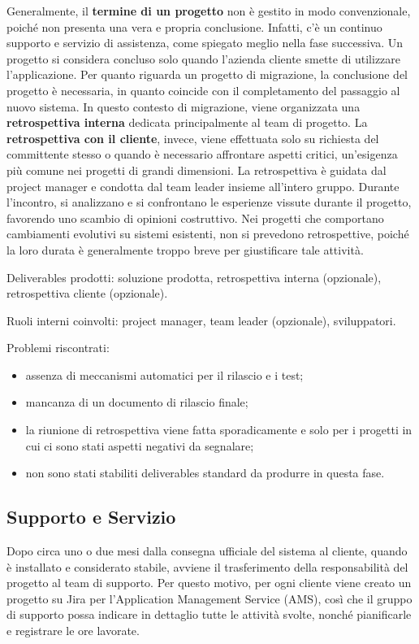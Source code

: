         Generalmente, il \textbf{termine di un progetto} non è gestito in modo convenzionale, poiché non presenta una vera e propria conclusione. Infatti, c'è un continuo
        supporto e servizio di assistenza, come spiegato meglio nella fase successiva. Un progetto si considera concluso solo quando l'azienda cliente smette di utilizzare l'applicazione.
        Per quanto riguarda un progetto di migrazione, la conclusione del progetto è necessaria, in quanto coincide con il completamento del passaggio al nuovo sistema.
        In questo contesto di migrazione, viene organizzata una \textbf{retrospettiva
        interna} dedicata principalmente al team di progetto. La \textbf{retrospettiva con il cliente}, invece, viene effettuata solo su richiesta del committente stesso o quando è
        necessario affrontare aspetti critici, un’esigenza più comune nei progetti di grandi dimensioni.
        La retrospettiva è guidata dal project manager e condotta dal team leader insieme all’intero gruppo. Durante l’incontro, si analizzano e si confrontano le esperienze
        vissute durante il progetto, favorendo uno scambio di opinioni costruttivo.
        Nei progetti che comportano cambiamenti evolutivi su sistemi esistenti, non si prevedono retrospettive, poiché la loro durata è generalmente troppo breve per giustificare tale attività.
        
        Deliverables prodotti: soluzione prodotta, retrospettiva interna (opzionale), retrospettiva cliente (opzionale).

        Ruoli interni coinvolti: project manager, team leader (opzionale), sviluppatori.

        Problemi riscontrati:
        \begin{itemize}
            \item assenza di meccanismi automatici per il rilascio e i test;
            \item mancanza di un documento di rilascio finale;
            \item la riunione di retrospettiva viene fatta sporadicamente e solo per i progetti in cui ci sono stati aspetti negativi da segnalare;
            \item non sono stati stabiliti deliverables standard da produrre in questa fase.
        \end{itemize}

    \subsection{Supporto e Servizio}
    Dopo circa uno o due mesi dalla consegna ufficiale del sistema al cliente, quando è installato e considerato stabile, avviene il trasferimento della
    responsabilità del progetto al team di supporto. Per questo motivo, per ogni cliente viene creato un progetto su Jira per l'Application Management Service (AMS),
    così che il gruppo di supporto possa indicare in dettaglio tutte le attività svolte, nonché pianificarle e registrare le ore lavorate.

